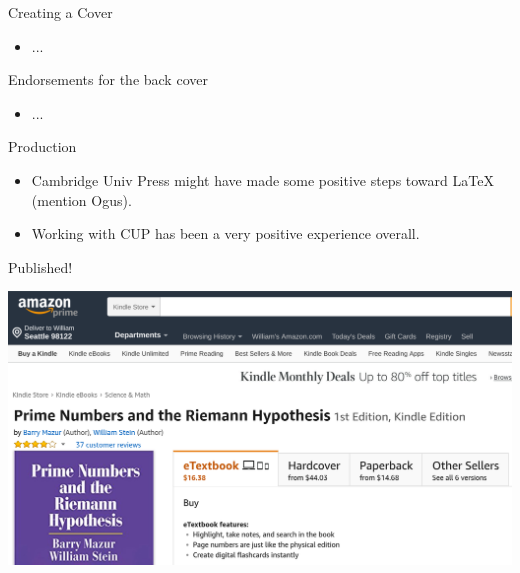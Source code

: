 \documentclass{beamer}
\begin{document}
\begin{frame}{Creating a Cover}
  \begin{itemize}
    \item ...
  \end{itemize}
\end{frame}


\begin{frame}{Endorsements for the back cover}
  \begin{itemize}
    \item ...
  \end{itemize}
\end{frame}

\begin{frame}{Production}
  \begin{itemize}
    \item Cambridge Univ Press might have made some positive steps toward \LaTeX{} (mention Ogus).
    \item Working with CUP has been a very positive experience overall.
  \end{itemize}

\end{frame}

\begin{frame}{Published!}

  \includegraphics[width=.98\textwidth]{pics/amazon-prime.png}

\end{frame}
\end{document}
